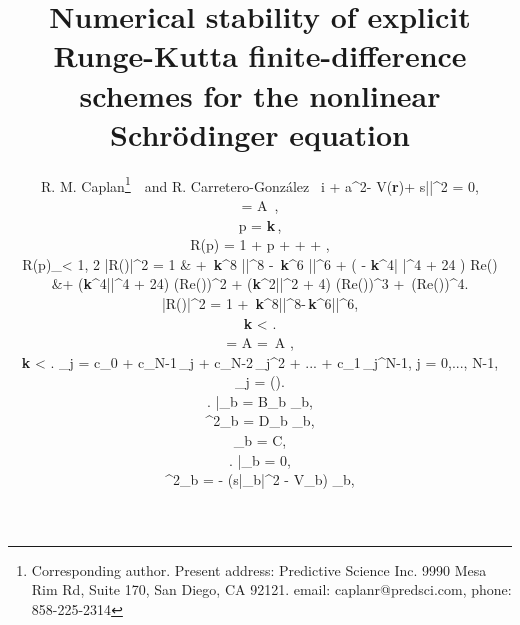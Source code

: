 \documentclass{article}
\begin{document}
\title{Numerical stability of explicit Runge-Kutta finite-difference schemes for the nonlinear Schr{\"o}dinger equation}
\author{R. M. Caplan\footnote{Corresponding author.  Present address:  Predictive Science Inc.  9990 Mesa Rim Rd, Suite 170, San Diego, CA 92121. email: caplanr@predsci.com, phone: 858-225-2314}~~and R. Carretero-Gonz{\'a}lez\
\label{nlse}
i + a\nabla^2\Psi - V({\bf r})\Psi + s|\Psi|^2 \Psi = 0,

\label{scheme}
 = {\cal A}\, \vec \Psi,

\label{hhatdef}
\vec p = {\bf k}\,\vec \lambda,

\label{req}
R(p) = 1 + p +  +  + ,

\label{rbound}
\lVert \vec R(\vec p)\rVert_\infty < 1,
{2}
\label{req2}
\left|R(\lambda)\right|^2 = 1 & + \,{\bf k}^8 |\lambda|^8 -
 \frac{1}{72}\,{\bf k}^6 |\lambda|^6 + \left( - {\bf k}^4| \lambda|^4 + 24 \right)\,\,\mbox{Re}(\lambda)    \\
&+ \left({\bf k}^4|\lambda|^4 + 24\right)\,\frac{{\bf k}^2}{12}\,(\mbox{Re}(\lambda))^2 + \left({\bf k}^2|\lambda|^2 + 4\right)\,\frac{{\bf k}^3}{3}\,(\mbox{Re}(\lambda))^3 + \,(\mbox{Re}(\lambda))^4.
\notag

\label{req3}
\left|R(\vec \lambda)\right|^2 = 1 + \,{\bf k}^8|\vec \lambda|^8-\,{\bf k}^6|\vec \lambda|^6,

\label{rk4stbeasy}
{\bf k} < .

 = {\cal A} \vec \Psi = \,A \vec \Psi,

\label{rk4stbeasy2}
{\bf k} < .
 \lambda_j = c_0 + c_{N-1}\,\omega_j + c_{N-2}\,\omega_j^2 + ... + c_1\,\omega_j^{N-1}, \qquad j = 0,..., {N-1},

\omega_j = \exp \left(\right).

\label{bb}
\left. \right|_b =  B_b \Psi_b,

\label{db}
\nabla^2\Psi_b =  D_b \Psi_b,

\Psi_b = C,

\left. \right|_b = 0,

\nabla^2\Psi_b = - (s|\Psi_b|^2 - V_b) \Psi_b,

}
\end{document}
